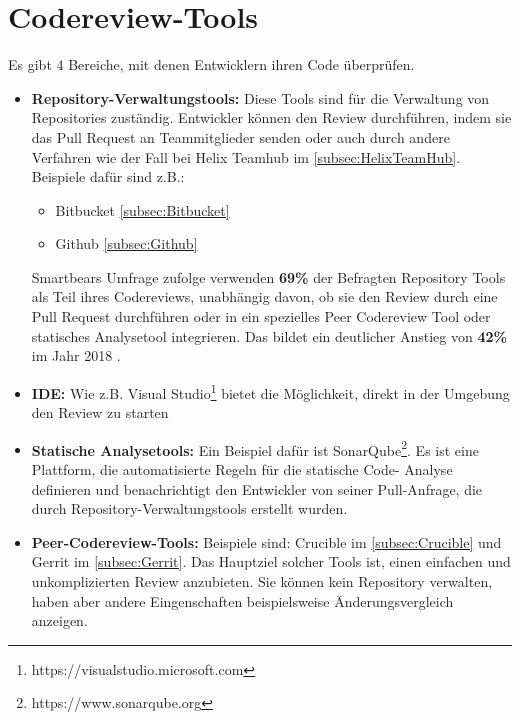 \section{Codereview-Tools}
\label{sec:Coderview-Tools}

Es gibt 4 Bereiche, mit denen Entwicklern ihren Code überprüfen.

\begin{itemize}
	\item \textbf{Repository-Verwaltungstools:} Diese Tools sind für die Verwaltung von Repositories zuständig. Entwickler können den Review durchführen, indem sie das Pull Request an
		Teammitglieder senden oder auch durch andere Verfahren wie der Fall bei Helix Teamhub im \cref{subsec:HelixTeamHub}.
		Beispiele dafür sind z.B.:
		\begin{itemize}
			\item Bitbucket \cref{subsec:Bitbucket}
			\item Github \cref{subsec:Github}
		\end{itemize}
	
		Smartbears Umfrage zufolge verwenden \textbf{69\%} der Befragten Repository Tools als Teil ihres Codereviews, unabhängig davon, ob sie den Review durch eine Pull Request 					durchführen oder in ein spezielles Peer Codereview Tool oder statisches Analysetool integrieren. Das bildet ein deutlicher Anstieg von \textbf{42\%} im Jahr 2018 							\cite{smartbear}.

	\item \textbf{\ac{IDE}:} Wie z.B. Visual Studio\footnote{https://visualstudio.microsoft.com} bietet die Möglichkeit, direkt in der Umgebung den Review zu starten

	\item \textbf{Statische Analysetools:} Ein Beispiel dafür ist SonarQube\footnote{https://www.sonarqube.org}. Es ist eine Plattform, die automatisierte Regeln für die statische Code-			Analyse definieren und benachrichtigt den Entwickler von seiner Pull-Anfrage, die durch Repository-Verwaltungstools erstellt wurden.

	\item \textbf{Peer-Codereview-Tools:} Beispiele sind: Crucible im \cref{subsec:Crucible} und Gerrit im \cref{subsec:Gerrit}. Das Hauptziel solcher Tools ist, einen einfachen und 				unkomplizierten Review anzubieten. Sie können kein Repository verwalten, haben aber andere Eingenschaften beispielsweise Änderungsvergleich anzeigen.
\end{itemize}


